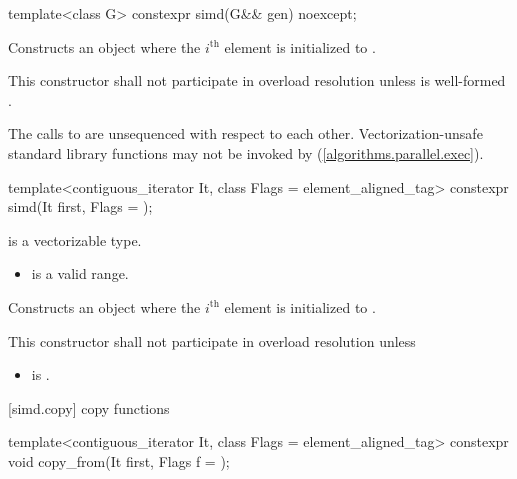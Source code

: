 \begin{itemdecl}
template<class G> constexpr simd(G&& gen) noexcept;
\end{itemdecl}

\begin{itemdescr}
  \pnum\effects
  Constructs an object where the $i^\text{th}$ element is initialized to .

  \pnum\remarks
  This constructor shall not participate in overload resolution unless  is well-formed \foralli.

  \pnum
  The calls to  are unsequenced with respect to each other. Vectorization-unsafe standard library functions may not be invoked by  (\ref{algorithms.parallel.exec}).
\end{itemdescr}

\begin{itemdecl}
template<contiguous_iterator It, class Flags = element_aligned_tag>
  constexpr simd(It first, Flags = {});
\end{itemdecl}

\begin{itemdescr}
  \pnum\constraints
   is a vectorizable type.

  \pnum\requires
  \begin{itemize}
    \item \tcode{[first, first + size())} is a valid range.
  \end{itemize}

  \pnum\effects
  Constructs an object where the $i^\text{th}$ element is initialized to  \foralli.

  \pnum\remarks
  This constructor shall not participate in overload resolution unless
  \begin{itemize}
    \item {} is .
  \end{itemize}
\end{itemdescr}

[simd.copy]{ copy functions}

\begin{itemdecl}
template<contiguous_iterator It, class Flags = element_aligned_tag>
  constexpr void copy_from(It first, Flags f = {});
\end{itemdecl}

